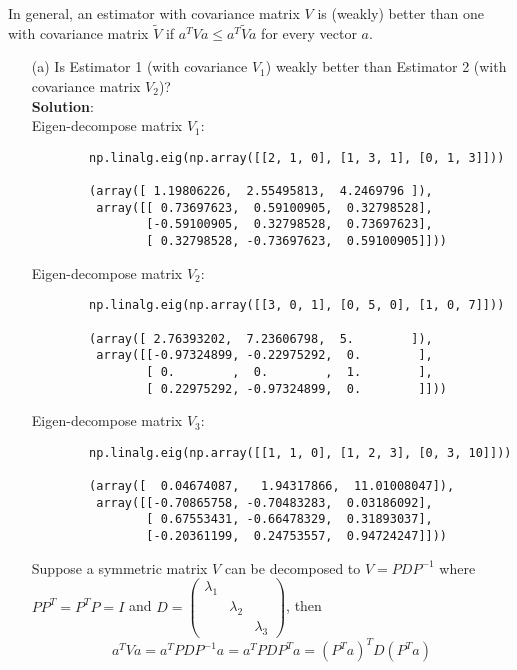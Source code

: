 \documentclass{article}
\begin{document}
\begin{enumerate}
    In general, an estimator with covariance matrix $V$ is (weakly) better than one with covariance matrix $\tilde{V}$ if $a^T V a \leq a^T \tilde{V} a$ for every vector $a$.
    \begin{enumerate}
        \item[(a)] Is Estimator 1 (with covariance $V_1$) weakly better than Estimator 2 (with covariance matrix $V_2$)? \\
        
        \textbf{Solution}: \\
        
        Eigen-decompose matrix $V_1$:
        
        \begin{verbatim}
        np.linalg.eig(np.array([[2, 1, 0], [1, 3, 1], [0, 1, 3]]))
        
        (array([ 1.19806226,  2.55495813,  4.2469796 ]),
         array([[ 0.73697623,  0.59100905,  0.32798528],
                [-0.59100905,  0.32798528,  0.73697623],
                [ 0.32798528, -0.73697623,  0.59100905]]))
        \end{verbatim}
        
        Eigen-decompose matrix $V_2$:
        
        \begin{verbatim}
        np.linalg.eig(np.array([[3, 0, 1], [0, 5, 0], [1, 0, 7]]))
        
        (array([ 2.76393202,  7.23606798,  5.        ]),
         array([[-0.97324899, -0.22975292,  0.        ],
                [ 0.        ,  0.        ,  1.        ],
                [ 0.22975292, -0.97324899,  0.        ]]))
        \end{verbatim}
        
        Eigen-decompose matrix $V_3$:
        
        \begin{verbatim}
        np.linalg.eig(np.array([[1, 1, 0], [1, 2, 3], [0, 3, 10]]))
        
        (array([  0.04674087,   1.94317866,  11.01008047]),
         array([[-0.70865758, -0.70483283,  0.03186092],
                [ 0.67553431, -0.66478329,  0.31893037],
                [-0.20361199,  0.24753557,  0.94724247]]))   
        \end{verbatim}
        
        Suppose a symmetric matrix $V$ can be decomposed to $V=PDP^{-1}$ where $PP^T = P^TP = I$ and $D=\begin{pmatrix}\lambda_1 & & \\ & \lambda_2 & \\ & & \lambda_3 \end{pmatrix}$, then 
        $$ a^T V a = a^T PDP^{-1} a = a^T PDP^T a = (P^Ta)^T D (P^Ta) $$
        

\end{enumerate}
\end{enumerate}
\end{document}
